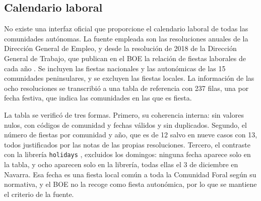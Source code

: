 \subsection{Calendario laboral}\label{sec:datos-calendario}

No existe una interfaz oficial que proporcione el calendario laboral de
todas las comunidades autónomas. La fuente empleada son las resoluciones
anuales de la Dirección General de Empleo, y desde la resolución de 2018 de
la Dirección General de Trabajo, que publican en el BOE la relación de fiestas laborales de cada año
\parencite{boe2016fiestas2017,boe2017fiestas2018,boe2018fiestas2019,boe2019fiestas2020,boe2020fiestas2021,boe2021fiestas2022,boe2022fiestas2023,boe2023fiestas2024}.
Se incluyen las fiestas nacionales y las autonómicas de las 15 comunidades
peninsulares, y se excluyen las fiestas locales. La información de las ocho
resoluciones se transcribió a una tabla de referencia con 237 filas, una por
fecha festiva, que indica las comunidades en las que es fiesta.

La tabla se verificó de tres formas. Primero, su coherencia interna: sin
valores nulos, con códigos de comunidad y fechas válidos y sin duplicados.
Segundo, el número de fiestas por comunidad y año, que es de 12 salvo en
nueve casos con 13, todos justificados por las notas de las propias
resoluciones. Tercero, el contraste con la librería \texttt{holidays}
\parencite{holidays2026}, excluidos los domingos: ninguna fecha aparece solo
en la tabla, y ocho aparecen solo en la librería, todas ellas el 3 de
diciembre en Navarra. Esa fecha es una fiesta local común a toda la
Comunidad Foral según su normativa, y el BOE no la recoge como fiesta
autonómica, por lo que se mantiene el criterio de la fuente.

